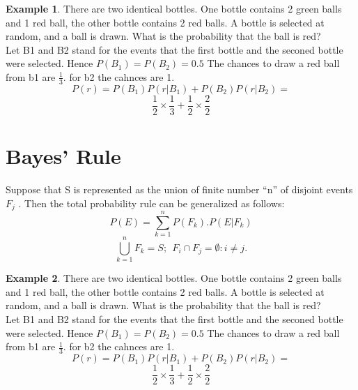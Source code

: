 \documentclass[12pt]{article}
\theoremstyle{definition}
\newtheorem{exmp}{Example}[section]
\begin{document}
\begin{exmp}
There are two identical bottles. One bottle
contains 2 green balls and 1 red ball, the
other bottle contains 2 red balls.
A bottle is selected at random, and a ball
is drawn.
What is the probability that the ball is red?\\


Let B1 and B2 stand for the events that the first bottle and the seconed bottle 
were selected. Hence $P(B_1) = P(B_2) = 0.5$ The chances to draw a red ball from b1 are 
    $\frac{1}{3}$. for b2 the cahnces are 1.
    \[
        P(r)= P(B_1)P(r|B_1) + P(B_2)P(r|B_2) =
    \]
    \[
        \frac{1}{2} \times \frac{1}{3} + \frac{1}{2} \times \frac{2}{2} 
    \]
\end{exmp}
\section{Bayes' Rule}
 Suppose that S is represented as the union of
finite number “n” of disjoint events $F_j$ .
 Then the total probability rule can be generalized as follows:
 \[
     \displaystyle P(E) = \sum_{k=1}^n P(F_k).P(E|F_k)
 \]
 \[
     \bigcup_{k=1}^n F_k = S; \ \ F_i \cap F_j = \emptyset : i \neq j.
 \]

\begin{exmp}
There are two identical bottles. One bottle
contains 2 green balls and 1 red ball, the
other bottle contains 2 red balls.
A bottle is selected at random, and a ball
is drawn.
What is the probability that the ball is red?\\


Let B1 and B2 stand for the events that the first bottle and the seconed bottle 
were selected. Hence $P(B_1) = P(B_2) = 0.5$ The chances to draw a red ball from b1 are 
    $\frac{1}{3}$. for b2 the cahnces are 1.
    \[
        P(r)= P(B_1)P(r|B_1) + P(B_2)P(r|B_2) =
    \]
    \[
        \frac{1}{2} \times \frac{1}{3} + \frac{1}{2} \times \frac{2}{2} 
    \]
\end{exmp}
\end{document}
